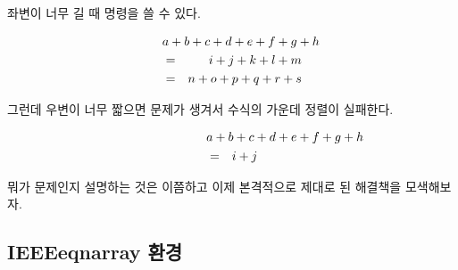 \noindent 좌변이 너무 길 때  명령을 쓸 수 있다.
\begin{examplek}
\begin{eqnarray}
  \lefteqn{a + b + c + d 
    + e + f + g + h}\nonumber\\
  & = & i + j + k + l + m 
  \\
  & = & n + o + p + q + r + s
\end{eqnarray}
\end{examplek}
\noindent 그런데 우변이 너무 짧으면 문제가 생겨서 수식의 가운데 정렬이 실패한다.
\begin{examplek}
\begin{eqnarray}
  \lefteqn{a + b + c + d 
    + e + f + g + h} 
  \nonumber \\
  & = & i + j 
\end{eqnarray}
\end{examplek}

\noindent 뭐가 문제인지 설명하는 것은 이쯤하고 이제 본격적으로 제대로 된 해결책을 모색해보자.

\subsection{IEEEeqnarray 환경}
\label{sec:IEEEeqnarray_intro}


